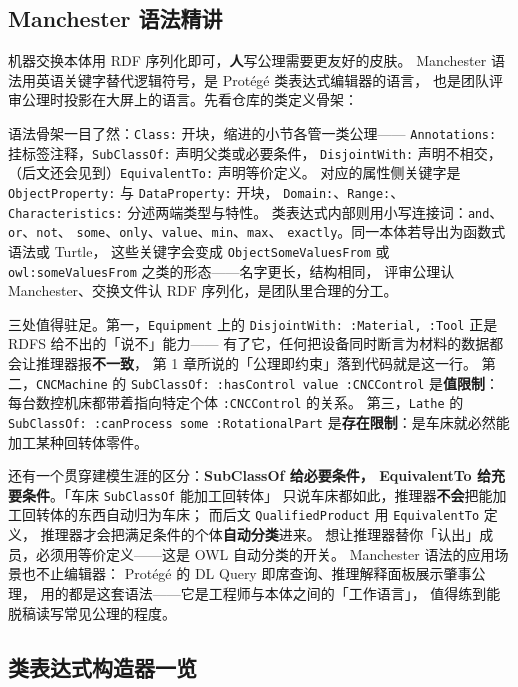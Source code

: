 \subsection{Manchester 语法精讲}

机器交换本体用 RDF 序列化即可，\textbf{人}写公理需要更友好的皮肤。
Manchester 语法用英语关键字替代逻辑符号，是 Protégé 类表达式编辑器的语言，
也是团队评审公理时投影在大屏上的语言。先看仓库的类定义骨架：



语法骨架一目了然：\texttt{Class:} 开块，缩进的小节各管一类公理——
\texttt{Annotations:} 挂标签注释，\texttt{SubClassOf:} 声明父类或必要条件，
\texttt{DisjointWith:} 声明不相交，（后文还会见到）\texttt{EquivalentTo:} 声明等价定义。
对应的属性侧关键字是 \texttt{ObjectProperty:} 与 \texttt{DataProperty:} 开块，
\texttt{Domain:}、\texttt{Range:}、\texttt{Characteristics:} 分述两端类型与特性。
类表达式内部则用小写连接词：\texttt{and}、\texttt{or}、\texttt{not}、
\texttt{some}、\texttt{only}、\texttt{value}、\texttt{min}、\texttt{max}、
\texttt{exactly}。同一本体若导出为函数式语法或 Turtle，
这些关键字会变成 \texttt{ObjectSomeValuesFrom} 或
\texttt{owl:someValuesFrom} 之类的形态——名字更长，结构相同，
评审公理认 Manchester、交换文件认 RDF 序列化，是团队里合理的分工。

三处值得驻足。第一，\texttt{Equipment} 上的
\texttt{DisjointWith: :Material, :Tool} 正是 RDFS 给不出的「说不」能力——
有了它，任何把设备同时断言为材料的数据都会让推理器报\textbf{不一致}，
第 1 章所说的「公理即约束」落到代码就是这一行。
第二，\texttt{CNCMachine} 的
\texttt{SubClassOf: :hasControl value :CNCControl} 是\textbf{值限制}：
每台数控机床都带着指向特定个体 \texttt{:CNCControl} 的关系。
第三，\texttt{Lathe} 的 \texttt{SubClassOf: :canProcess some :RotationalPart}
是\textbf{存在限制}：是车床就必然能加工某种回转体零件。

还有一个贯穿建模生涯的区分：\textbf{SubClassOf 给必要条件，
EquivalentTo 给充要条件}。「车床 \texttt{SubClassOf} 能加工回转体」
只说车床都如此，推理器\textbf{不会}把能加工回转体的东西自动归为车床；
而后文 \texttt{QualifiedProduct} 用 \texttt{EquivalentTo} 定义，
推理器才会把满足条件的个体\textbf{自动分类}进来。
想让推理器替你「认出」成员，必须用等价定义——这是 OWL 自动分类的开关。
Manchester 语法的应用场景也不止编辑器：
Protégé 的 DL Query 即席查询、推理解释面板展示肇事公理，
用的都是这套语法——它是工程师与本体之间的「工作语言」，
值得练到能脱稿读写常见公理的程度。

\subsection{类表达式构造器一览}

